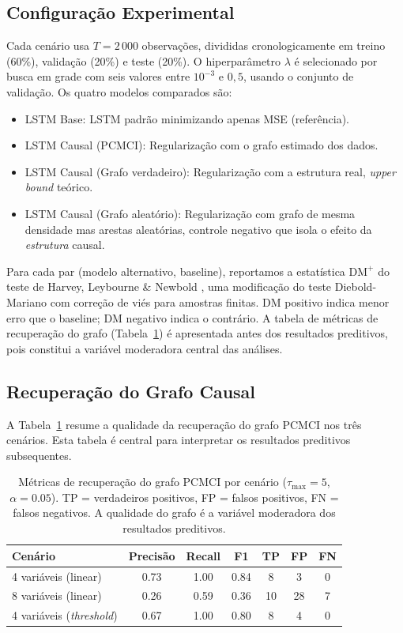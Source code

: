 \documentclass[12pt, a4paper]{article}
\begin{document}
\subsection{Configuração Experimental}

Cada cenário usa $T = 2\,000$ observações, divididas cronologicamente em treino (60\%), validação (20\%) e teste (20\%). O hiperparâmetro $\lambda$ é selecionado por busca em grade com seis valores entre $10^{-3}$ e $0{,}5$, usando o conjunto de validação. Os quatro modelos comparados são:

\begin{itemize}
    \item LSTM Base: LSTM padrão minimizando apenas MSE (referência).
    \item LSTM Causal (PCMCI): Regularização com o grafo estimado dos dados.
    \item LSTM Causal (Grafo verdadeiro): Regularização com a estrutura real, \emph{upper bound} teórico.
    \item LSTM Causal (Grafo aleatório): Regularização com grafo de mesma densidade mas arestas aleatórias, controle negativo que isola o efeito da \emph{estrutura} causal.
\end{itemize}

Para cada par (modelo alternativo, baseline), reportamos a estatística $\text{DM}^+$ do teste de Harvey, Leybourne \& Newbold \cite{harvey1997}, uma modificação do teste Diebold-Mariano \cite{diebold1995} com correção de viés para amostras finitas. DM positivo indica menor erro que o baseline; DM negativo indica o contrário. A tabela de métricas de recuperação do grafo (Tabela~\ref{tab:graph_recovery}) é apresentada antes dos resultados preditivos, pois constitui a variável moderadora central das análises.

\subsection{Recuperação do Grafo Causal}

A Tabela~\ref{tab:graph_recovery} resume a qualidade da recuperação do grafo PCMCI nos três cenários. Esta tabela é central para interpretar os resultados preditivos subsequentes.

\begin{table}[H]
\centering
\caption{Métricas de recuperação do grafo PCMCI por cenário ($\tau_{\max}=5$, $\alpha=0.05$). TP = verdadeiros positivos, FP = falsos positivos, FN = falsos negativos. A qualidade do grafo é a variável moderadora dos resultados preditivos.}
\label{tab:graph_recovery}
\begin{tabular}{lcccccc}
\toprule
Cenário & Precisão & Recall & F1 & TP & FP & FN \\
\midrule
4 variáveis (linear)    & 0.73 & 1.00 & 0.84 & 8 & 3  & 0 \\
8 variáveis (linear)    & 0.26 & 0.59 & 0.36 & 10 & 28 & 7 \\
4 variáveis (\emph{threshold}) & 0.67 & 1.00 & 0.80 & 8 & 4  & 0 \\
\bottomrule
\end{tabular}
\end{table}
\end{document}
